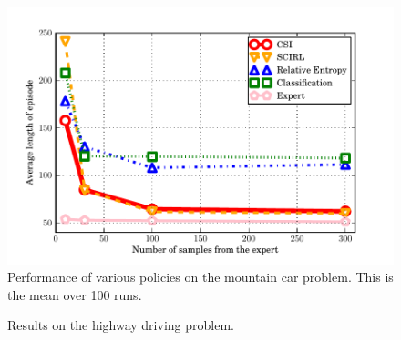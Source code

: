 \documentclass{llncs}
\begin{document}
\begin{figure}
  \center
  \includegraphics[width=.71\textwidth]{Exp11.pdf}
  \caption{Performance of various policies on the mountain car problem. This is the mean over 100 runs.}
  \label{fig:MountainCar}
\end{figure}


  \begin{figure}
  \caption{Results on the highway driving problem.}
  \label{fig:Highway}

\end{figure}
\end{document}
